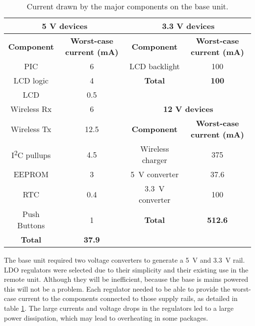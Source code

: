 \begin{table}[htb]
	\centering
	\caption{Current drawn by the major components on the base unit.}
	\label{tab: base current}
	\begin{adjustwidth}{-.5in}{-.5in}
	\begin{center}
	\begin{tabular}{|c|c|c|c|}
	\hline
	\multicolumn{2}{|c}{\textbf{5 V devices}} & \multicolumn{2}{|c|}{\textbf{3.3 V devices}}\\
	\hline
	\textbf{Component} & \textbf{Worst-case current (mA)} & \textbf{Component} & \textbf{Worst-case current (mA)} \\
	\hline
	PIC & 6 & LCD backlight & 100 \\
	\cline{3-4}
	LCD logic & 4 & \textbf{Total} & \textbf{100}\\
	\cline{3-4}
	LCD & 0.5 & \multicolumn{2}{c}{} \\
	\cline{3-4}
	Wireless Rx & 6 &  \multicolumn{2}{c|}{\textbf{12 V devices}} \\
	\cline{3-4}
	Wireless Tx & 12.5 & \textbf{Component} & \textbf{Worst-case current (mA)}  \\
	\cline{3-4}
	I\textsuperscript{2}C pullups & 4.5 & Wireless charger & 375 \\
	EEPROM & 3 & \SI{5}{\volt} converter & 37.6 \\
	RTC & 0.4 & \SI{3.3}{\volt} converter & 100 \\
	\cline{3-4}
	Push Buttons & 1 & \textbf{Total} & \textbf{512.6}  \\
	\hline
	\textbf{Total} & \textbf{37.9}  \\
	\cline{1-2}
	\end{tabular}
	\end{center}
	\end{adjustwidth}
\end{table}

The base unit required two voltage converters to generate a \SI{5}{\volt} and \SI{3.3}{\volt} rail. LDO regulators were selected due to their simplicity and their existing use in the remote unit. Although they will be inefficient, because the base is mains powered this will not be a problem. Each regulator needed to be able to provide the worst-case current to the components connected to those supply rails, as detailed in table \ref{tab: base current}. The large currents and voltage drops in the regulators led to a large power dissipation, which may lead to overheating in some packages.\\

